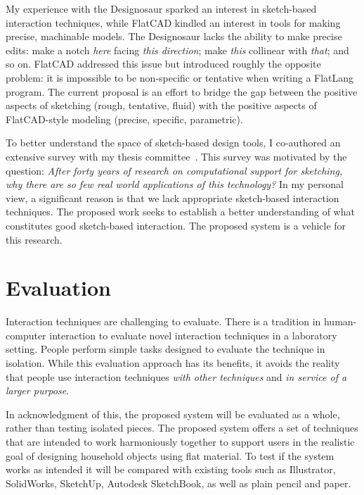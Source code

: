 \documentclass[12pt]{article}
\begin{document}
My experience with the Designosaur sparked an interest in sketch-based
interaction techniques, while FlatCAD kindled an interest in tools for
making precise, machinable models. The Designosaur lacks the ability
to make precise edits: make a notch \textit{here} facing \textit{this
  direction}; make \textit{this} collinear with \textit{that}; and so
on. FlatCAD addressed this issue but introduced roughly the opposite
problem: it is impossible to be non-specific or tentative when writing
a FlatLang program. The current proposal is an effort to bridge the
gap between the positive aspects of sketching (rough, tentative,
fluid) with the positive aspects of FlatCAD-style modeling (precise,
specific, parametric).

To better understand the space of sketch-based design tools, I
co-authored an extensive survey with my thesis
committee~\cite{johnson-sketch-review}. This survey was motivated by
the question: \textit{After forty years of research on computational
  support for sketching, why there are so few real world applications
  of this technology?} In my personal view, a significant reason is
that we lack appropriate sketch-based interaction techniques. The
proposed work seeks to establish a better understanding of what
constitutes good sketch-based interaction. The proposed system is a
vehicle for this research.

\section{Evaluation}

Interaction techniques are challenging to evaluate. There is a
tradition in human-computer interaction to evaluate novel interaction
techniques in a laboratory setting. People perform simple tasks
designed to evaluate the technique in isolation. While this evaluation
approach has its benefits, it avoids the reality that people use
interaction techniques \textit{with other techniques} and \textit{in
  service of a larger purpose}. 

In acknowledgment of this, the proposed system will be evaluated as a
whole, rather than testing isolated pieces. The proposed system offers
a set of techniques that are intended to work harmoniously together to
support users in the realistic goal of designing household objects
using flat material. To test if the system works as intended it will
be compared with existing tools such as Illustrator, SolidWorks,
SketchUp, Autodesk SketchBook, as well as plain pencil and paper. 
\end{document}
